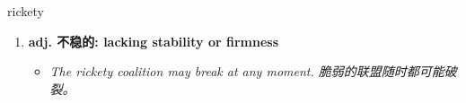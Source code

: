 
\begin{frame}
{\huge rickety}
\begin{center}
\begin{enumerate}\Large
  \item \textbf{adj. 不稳的: lacking stability or firmness}
  \begin{itemize}
    \item \em{\Large{The rickety coalition may break at any moment. 脆弱的联盟随时都可能破裂。}}
  \end{itemize}
\end{enumerate}
\end{center}
\end{frame}
